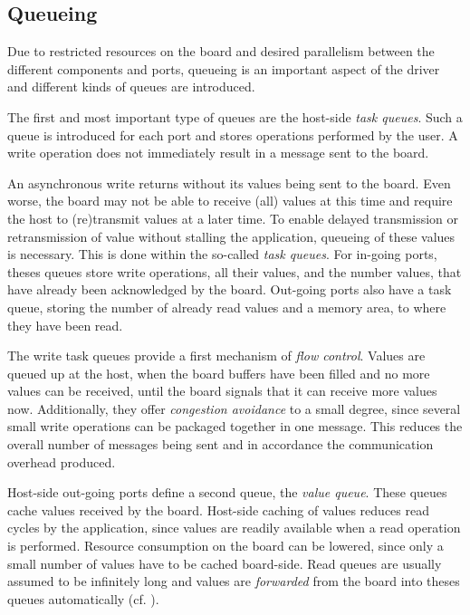 \documentclass{report}
\begin{document}
\subsection{Queueing}
\label{sec:arch:queue}
Due to restricted resources on the board and desired parallelism between the different components and ports, queueing is an important aspect of the driver and different kinds of queues are introduced.

The first and most important type of queues are the host-side \textit{task queues}. Such a queue is introduced for each port and stores operations performed by the user. A write operation does not immediately result in a message sent to the board.

An asynchronous write returns without its values being sent to the board. Even worse, the board may not be able to receive (all) values at this time and require the host to (re)transmit values at a later time. 
To enable delayed transmission or retransmission of value without stalling the application, queueing of these values is necessary. This is done within the so-called \textit{task queues}. For in-going ports, theses queues store write operations, all their values, and the number values, that have already been acknowledged by the board. Out-going ports also have a task queue, storing the number of already read values and a memory area, to where they have been read.

The write task queues provide a first mechanism of \textit{flow control}. Values are queued up at the host, when the board buffers have been filled and no more values can be received, until the board signals that it can receive more values now.
Additionally, they offer \textit{congestion avoidance} to a small degree, since several small write operations can be packaged together in one message. This reduces the overall number of messages being sent and in accordance the communication overhead produced.

Host-side out-going ports define a second queue, the \textit{value queue}. These queues cache values received by the board. Host-side caching of values reduces read cycles by the application, since values are readily available when a read operation is performed. Resource consumption on the board can be lowered, since only a small number of values have to be cached board-side. Read queues are usually assumed to be infinitely long and values are \textit{forwarded} from the board into theses queues automatically (cf. ).
\end{document}
